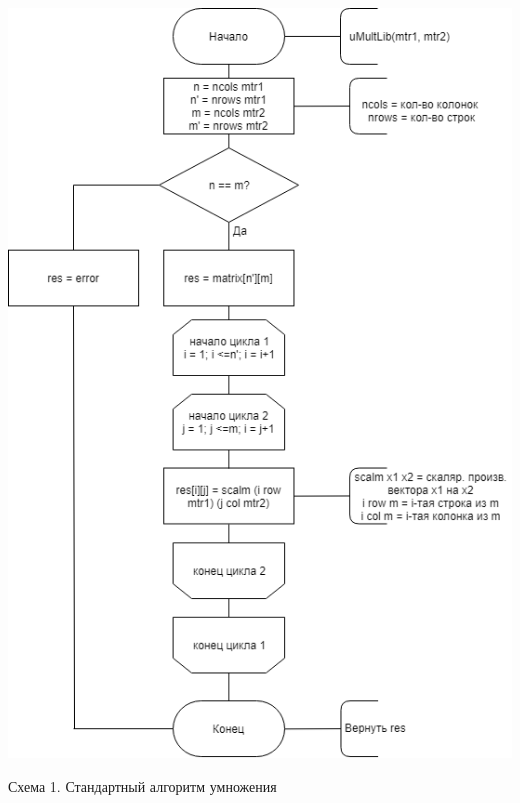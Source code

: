 \documentclass[12pt]{report}
\begin{document}
\begin{center}
    \includegraphics[scale=0.6]{UsualMult}

    Схема 1. Стандартный алгоритм умножения


\end{center}
\end{document}
